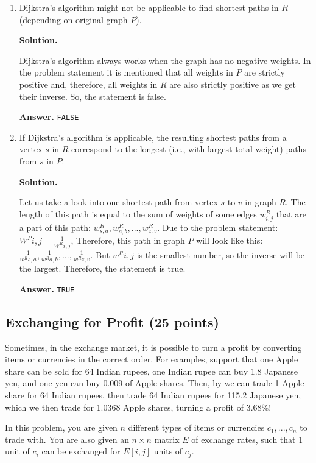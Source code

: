 \documentclass{article}
\begin{document}
\begin{enumerate}
    \item Dijkstra’s algorithm might not be applicable to find shortest paths in $R$ (depending on original graph $P$).

    \textbf{Solution.}

    Dijkstra’s algorithm always works when the graph has no negative weights. In the problem statement it is mentioned that all weights in $P$ are strictly positive and, therefore, all weights in $R$ are also strictly positive as we get their inverse. So, the statement is false.

    \textbf{Answer.} \texttt{FALSE}
    
    \item If Dijkstra’s algorithm is applicable, the resulting shortest paths from a
vertex $s$ in $R$ correspond to the longest (i.e., with largest total weight) paths from $s$ in $P$.

    \textbf{Solution.}

    Let us take a look into one shortest path from vertex $s$ to $v$ in graph $R$. The length of this path is equal to the sum of weights of some edges $w^R_{i,j}$ that are a part of this path: $w^R_{s,a}, w^R_{a,b}, ..., w^R_{z,v}$. Due to the problem statement: $W^P{i,j}=\frac{1}{W^R{i,j}}$, Therefore, this path in graph $P$ will look like this: $\frac{1}{w^R{s,a}}, \frac{1}{w^R{a,b}}, ..., \frac{1}{w^R{z,v}}$. But $w^R{i,j}$ is the smallest number, so the inverse will be the largest. Therefore, the statement is true.

    \textbf{Answer.} \texttt{TRUE}
\end{enumerate}

\subsection{Exchanging for Profit (25 points)}

Sometimes, in the exchange market, it is possible to turn a profit by converting items or currencies in the correct order. For examples, support that one Apple share can be sold for 64 Indian rupees, one Indian rupee can buy 1.8 Japanese yen, and one yen can buy 0.009 of Apple shares. Then, by we can trade 1 Apple share for 64 Indian rupees, then trade 64 Indian rupees for 115.2 Japanese yen, which we then trade for 1.0368 Apple shares, turning a profit of 3.68\%!

In this problem, you are given $n$ different types of items or currencies $c_1, ..., c_n$ to trade with. You are also given an $n \times n$ matrix $E$ of exchange rates, such that 1 unit of $c_i$ can be exchanged for $E[i, j]$ units of $c_j$.
\end{document}
